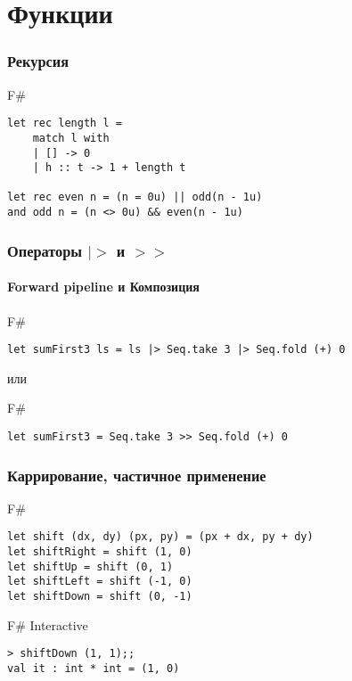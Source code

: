 \documentclass[xetex,mathserif,serif]{beamer}
\begin{document}
	\section{Функции}

	\begin{frame}[fragile]
		\frametitle{Рекурсия}
		\begin{exampleblock}{F\#}
			\begin{lstlisting}
let rec length l =
    match l with
    | [] -> 0
    | h :: t -> 1 + length t

let rec even n = (n = 0u) || odd(n - 1u)
and odd n = (n <> 0u) && even(n - 1u)			
            \end{lstlisting}
		\end{exampleblock}
\end{frame}

	\begin{frame}[fragile]
		\frametitle{Операторы $|>$ и $>>$}
		\framesubtitle{Forward pipeline и Композиция}
		\begin{exampleblock}{F\#}
			\begin{lstlisting}
let sumFirst3 ls = ls |> Seq.take 3 |> Seq.fold (+) 0
            \end{lstlisting}
        \end{exampleblock}
        или
		\begin{exampleblock}{F\#}
			\begin{lstlisting}
let sumFirst3 = Seq.take 3 >> Seq.fold (+) 0
            \end{lstlisting}
		\end{exampleblock}
\end{frame}

	\begin{frame}[fragile]
		\frametitle{Каррирование, частичное применение}
		\begin{exampleblock}{F\#}
			\begin{lstlisting}
let shift (dx, dy) (px, py) = (px + dx, py + dy)
let shiftRight = shift (1, 0)
let shiftUp = shift (0, 1)
let shiftLeft = shift (-1, 0)
let shiftDown = shift (0, -1)
            \end{lstlisting}
		\end{exampleblock}
		\begin{alertblock}{F\# Interactive}
			\begin{lstlisting}
> shiftDown (1, 1);;
val it : int * int = (1, 0)
            \end{lstlisting}
		\end{alertblock}
\end{frame}
\end{document}
